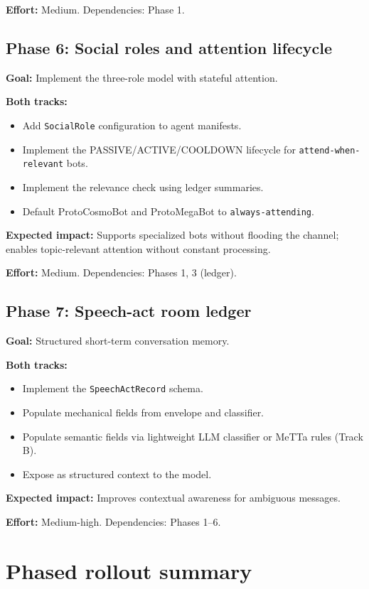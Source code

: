 \documentclass[11pt]{article}
\begin{document}
\textbf{Effort:} Medium.  Dependencies: Phase 1.

\subsection{Phase 6: Social roles and attention lifecycle}

\textbf{Goal:} Implement the three-role model with stateful attention.

\textbf{Both tracks:}
\begin{itemize}
\item Add \texttt{SocialRole} configuration to agent manifests.
\item Implement the PASSIVE/ACTIVE/COOLDOWN lifecycle for
\texttt{attend-when-relevant} bots.
\item Implement the relevance check using ledger summaries.
\item Default ProtoCosmoBot and ProtoMegaBot to \texttt{always-attending}.
\end{itemize}

\textbf{Expected impact:} Supports specialized bots without flooding the
channel; enables topic-relevant attention without constant processing.

\textbf{Effort:} Medium.  Dependencies: Phases 1, 3 (ledger).

\subsection{Phase 7: Speech-act room ledger}

\textbf{Goal:} Structured short-term conversation memory.

\textbf{Both tracks:}
\begin{itemize}
\item Implement the \texttt{SpeechActRecord} schema.
\item Populate mechanical fields from envelope and classifier.
\item Populate semantic fields via lightweight LLM classifier or MeTTa rules
(Track B).
\item Expose as structured context to the model.
\end{itemize}

\textbf{Expected impact:} Improves contextual awareness for ambiguous messages.

\textbf{Effort:} Medium-high.  Dependencies: Phases 1--6.

\section{Phased rollout summary}
\end{document}
